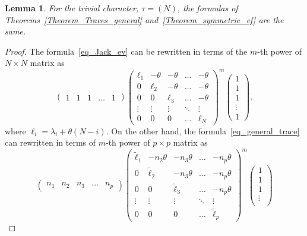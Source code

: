 \documentclass[11pt]{article}
\newtheorem{lemma}[theo]{Lemma}
\theoremstyle{definition}
\numberwithin{equation}{section}
\begin{document}
\begin{lemma} \label{Lemma_symmetric_ev_match} For the trivial character, $\tau=(N)$, the formulas of Theorems~\ref{Theorem_Traces_general} and~\ref{Theorem_symmetric_ef} are the same.
\end{lemma}
\begin{proof} The formula~\eqref{eq_Jack_ev} can be rewritten in terms of the $m$-th power of $N\times N$ matrix as
\begin{equation}
\label{eq_x12}
\begin{pmatrix}
1 & 1 & 1 & \ldots & 1
\end{pmatrix}
\begin{pmatrix}
\ell_{1} & -\theta & -\theta & \ldots & -\theta\\
0 & \ell_{2} & -\theta & \ldots & -\theta\\
0 & 0 & \ell_{3} & \ldots & -\theta\\
\vdots & \vdots & \vdots & \ddots & \vdots\\
0 & 0 & 0 & \ldots &  \ell_{N}
\end{pmatrix}
^{m}
\begin{pmatrix}
1\\
1\\
1\\
\vdots\\
1
\end{pmatrix},
\end{equation}
where $\ell_i=\lambda_i+\theta(N-i)$. On the other hand, the formula~\eqref{eq_general_trace} can rewritten in terms of $m$-th power of $p\times p$ matrix as
\begin{equation}
\label{eq_x13}
\begin{pmatrix}
n_{1} & n_{2} & n_{3} & \ldots & n_{p}
\end{pmatrix}
\begin{pmatrix}
\tilde \ell_{1} & -n_{2}\theta & -n_{3}\theta & \ldots & -n_{p}\theta\\
0 & \tilde \ell_{2} & -n_{3}\theta & \ldots & -n_{p}\theta\\
0 & 0 & \tilde \ell_{3} & \ldots & -n_{p}\theta\\
\vdots & \vdots & \vdots & \ddots & \vdots\\
0 & 0 & 0 & \ldots & \tilde \ell_{p}
\end{pmatrix}
^{m}
\begin{pmatrix}
1\\
1\\
1\\
\vdots\\

\end{pmatrix}
\end{equation}
\end{proof}
\end{document}
